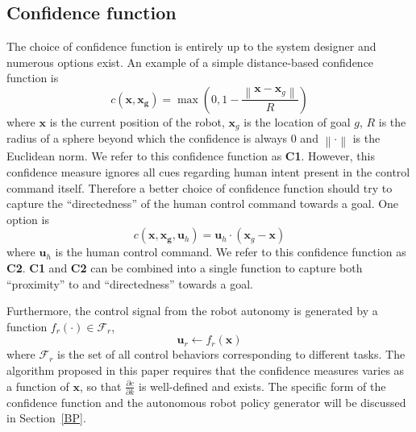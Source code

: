 \documentclass[conference]{IEEEtran}
\newcommand{\norm}[1]{\left\lVert#1\right\rVert}
\begin{document}
\subsection{Confidence function}\label{CF}
The choice of confidence function is entirely up to the system designer and numerous options exist. An example of a simple distance-based confidence function is
\begin{equation*}\label{EQ1}
c(\boldsymbol{x}, \boldsymbol{x_g}) = \max(0, 1 - \frac{\norm{\boldsymbol{x} - \boldsymbol{x}_{g}}}{R})
\end{equation*}
where $\boldsymbol{x}$ is the current position of the robot, $\boldsymbol{x}_{g}$ is the location of goal $g$, $R$ is the radius of a sphere beyond which the confidence is always $0$ and $\norm{\cdot}$ is the Euclidean norm. We refer to this confidence function as \textbf{C1}. However, this confidence measure ignores all cues regarding human intent present in the control command itself. Therefore a better choice of confidence function should try to capture the ``directedness'' of the human control command towards a goal. One option is
\begin{equation*}\label{EQ2}
c({\boldsymbol{x},\boldsymbol{x_g}, \boldsymbol{u}_{h}}) = \boldsymbol{u}_h\cdot(\boldsymbol{x}_{g} - \boldsymbol{x})
\end{equation*}
where $\boldsymbol{u}_h$ is the human control command. We refer to this confidence function as \textbf{C2}. \textbf{C1} and \textbf{C2} can be combined into a single function to capture both ``proximity'' to and ``directedness'' towards a goal.

Furthermore, the control signal from the robot autonomy is generated by a function $f_{r}(\cdot) \in \mathcal{F}_{r}$, 
\begin{equation*}
\boldsymbol{u}_r \leftarrow f_{r}(\boldsymbol{x})
\end{equation*}
where $\mathcal{F}_{r}$ is the set of all control behaviors corresponding to different tasks. The algorithm proposed in this paper requires that the confidence measures varies as a function of $\boldsymbol{x}$, so that $\frac{\partial c}{\partial k}$ is well-defined and exists. The specific form of the confidence function and the autonomous robot policy generator will be discussed in Section~\ref{BP}.
\end{document}
